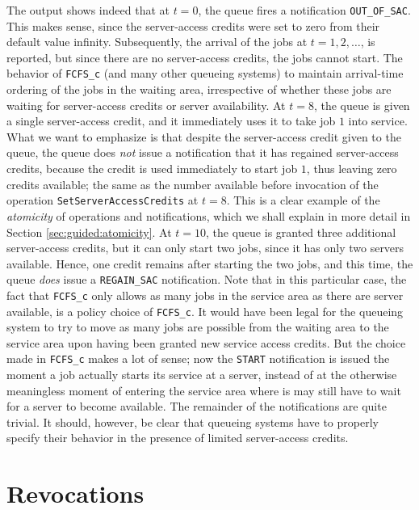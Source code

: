 The output shows indeed that at $t=0$,
  the queue fires a notification \lstinline|OUT_OF_SAC|.
This makes sense, since the server-access credits
  were set to zero from their default
  value infinity.
Subsequently,
  the arrival of the jobs at $t=1, 2, \ldots$,
  is reported,
  but since there are no server-access credits,
  the jobs cannot start.
The behavior of \lstinline|FCFS_c|
  (and many other queueing systems)
  to maintain arrival-time ordering
  of the jobs in the waiting area,
  irrespective of
  whether these jobs are waiting for
  server-access credits or server availability.
At $t=8$, the queue is given a single
  server-access credit,
  and it immediately uses it to
  take job $1$ into service.
What we want to emphasize is that
  despite the server-access credit given to the queue,
  the queue does {\em not\/} issue a notification
  that it has regained server-access credits,
  because the credit is used immediately to start
  job $1$, thus leaving zero credits available;
  the same as the number available before
  invocation of the operation \lstinline|SetServerAccessCredits|
  at $t=8$.
This is a clear example of the {\em atomicity\/}
  of operations and notifications,
  which we shall explain in more detail in Section \ref{sec:guided:atomicity}.
At $t=10$, the queue is granted three additional server-access credits,
  but it can only start two jobs, since it has only two servers available.
Hence, one credit remains after starting the two jobs,
  and this time,
  the queue {\em does\/} issue
  a \lstinline|REGAIN_SAC| notification.
Note that in this particular case,
  the fact that \lstinline|FCFS_c|
  only allows as many jobs in the service area as there are server available,
  is a policy choice of \lstinline|FCFS_c|.
It would have been legal for the queueing system
  to try to move as many jobs are possible from the waiting area
  to the service area upon having been granted new service access credits.
But the choice made in \lstinline|FCFS_c| makes a lot of sense;
  now the \lstinline|START| notification
  is issued the moment a job actually starts its service at a
  server,
  instead of at the otherwise meaningless moment
  of entering the service area
  where is may still have to wait for a server to become available.
The remainder of the notifications are quite trivial.
It should, however,
  be clear that queueing systems have to properly
  specify their behavior in the presence of limited
  server-access credits.
  
\section{Revocations}
\label{sec:guided:revocations}

